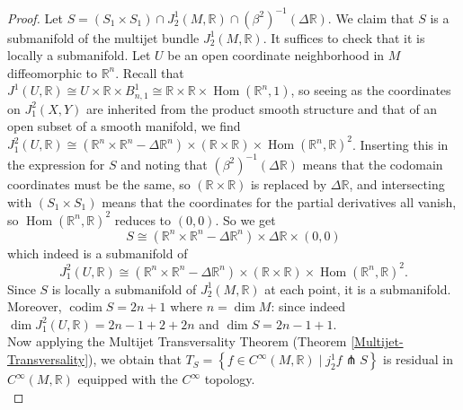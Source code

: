 \documentclass[reqno]{amsart}
\theoremstyle{definition}
\theoremstyle{remark}
\DeclareMathOperator{\Hom}{Hom}
\DeclareMathOperator{\codim}{codim}
\begin{document}
 \begin{proof}
     Let
     $S = \left( S_1 \times S_1 \right) \cap
     J_2^{1}(M,\mathbb{R}) \cap
     \left( \beta^2 \right)^{-1}
     \left( \Delta \mathbb{R} \right) $.
     We claim that $S$ is a submanifold of the
     multijet bundle
     $J_2^{1}(M,\mathbb{R})$.
     It suffices to check that it is locally
     a submanifold.
     Let $U$ be an open coordinate
     neighborhood in $M$ diffeomorphic to
     $\mathbb{R}^{n}$. Recall that
     $J^{1}(U,\mathbb{R}) \cong
     U \times \mathbb{R} \times B_{n,1}^{1}
     \cong \mathbb{R} \times \mathbb{R} \times 
     \Hom \left( \mathbb{R}^{n},1 \right) $, so
     seeing as the coordinates on
     $J_1^2 (X,Y)$ are inherited from the product smooth
     structure and that of an open subset of a smooth
     manifold, we find
     $J_1^2(U, \mathbb{R}) \cong
     \left( \mathbb{R}^{n} \times \mathbb{R}^{n}
     - \Delta\mathbb{R}^{n} \right) \times 
     \left( \mathbb{R} \times \mathbb{R} \right) 
     \times \Hom\left(\mathbb{R}^{n},\mathbb{R}  \right)^2 $.
     Inserting this in the expression for
     $S$ and noting that
     $\left( \beta^2 \right)^{-1}
     \left( \Delta \mathbb{R} \right) $ means
     that the codomain coordinates must be the same,
     so $\left( \mathbb{R} \times \mathbb{R} \right) $ is
     replaced by $\Delta \mathbb{R}$, and
     intersecting with $\left( S_1 \times S_1 \right) $ means
     that the coordinates for the
     partial derivatives all vanish, so
     $\Hom \left( \mathbb{R}^{n},\mathbb{R} \right)^2$ reduces
     to $\left( 0,0 \right) $. So we get
     \[
     S \cong \left( \mathbb{R}^{n} \times \mathbb{R}^{n}
     - \Delta \mathbb{R}^{n} \right) \times 
     \Delta \mathbb{R} \times \left( 0,0 \right) 
     \] 
     which indeed is a submanifold of
     \[
         J_1^2 \left( U, \mathbb{R} \right) 
         \cong 
         \left( \mathbb{R}^{n} \times \mathbb{R}^{n}
         - \Delta \mathbb{R}^{n} \right) \times 
         \left( \mathbb{R} \times \mathbb{R} \right) 
         \times \Hom \left( \mathbb{R}^{n},\mathbb{R} \right)^2.
     \] 
     Since $S$ is locally a submanifold of
     $J_2^{1}(M,\mathbb{R})$ at each point, it is a submanifold.
     Moreover, 
     $\codim S = 2n+1$ where $n = \dim M$: since indeed
     $\dim J_1^2 \left( U,\mathbb{R} \right) 
     = 2n - 1 + 2 + 2n$ and
     $\dim S = 2n-1 + 1$.\\
     Now applying the Multijet Transversality Theorem
 (Theorem \ref{Multijet-Transversality}), we obtain that
  $T_{S} = 
  \left\{ f \in C^{\infty}(M, \mathbb{R}) \mid 
  j_2^{1} f \pitchfork S \right\} $ is
  residual in
  $C^{\infty}(M, \mathbb{R})$ equipped with the
  $C^{\infty}$ topology.\\



\end{proof}
\end{document}
